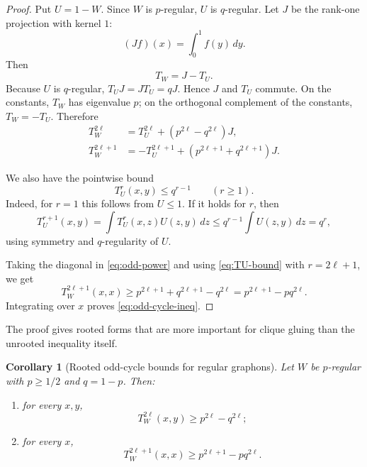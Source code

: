 \documentclass[11pt]{article}
\newtheorem{corollary}[theorem]{Corollary}
\theoremstyle{definition}
\begin{document}
\begin{proof}
Put $U=1-W$.  Since $W$ is $p$-regular, $U$ is $q$-regular.  Let $J$ be the rank-one projection with kernel $1$:
\[
  (Jf)(x)=\int_0^1 f(y)\,dy.
\]
Then
\[
  T_W=J-T_U.
\]
Because $U$ is $q$-regular, $T_UJ=JT_U=qJ$.  Hence $J$ and $T_U$ commute.  On the constants, $T_W$ has eigenvalue $p$; on the orthogonal complement of the constants, $T_W=-T_U$.  Therefore
\begin{align}
  T_W^{2\ell} &= T_U^{2\ell}+(p^{2\ell}-q^{2\ell})J, \label{eq:even-power}\\
  T_W^{2\ell+1} &= -T_U^{2\ell+1}+(p^{2\ell+1}+q^{2\ell+1})J. \label{eq:odd-power}
\end{align}

We also have the pointwise bound
\begin{equation}\label{eq:TU-bound}
  T_U^r(x,y)\le q^{r-1}\qquad(r\ge1).
\end{equation}
Indeed, for $r=1$ this follows from $U\le1$.  If it holds for $r$, then
\[
  T_U^{r+1}(x,y)=\int T_U^r(x,z)U(z,y)\,dz
  \le q^{r-1}\int U(z,y)\,dz=q^r,
\]
using symmetry and $q$-regularity of $U$.

Taking the diagonal in \eqref{eq:odd-power} and using \eqref{eq:TU-bound} with $r=2\ell+1$, we get
\[
  T_W^{2\ell+1}(x,x)
  \ge p^{2\ell+1}+q^{2\ell+1}-q^{2\ell}
  =p^{2\ell+1}-p q^{2\ell}.
\]
Integrating over $x$ proves \eqref{eq:odd-cycle-ineq}.
\end{proof}

The proof gives rooted forms that are more important for clique gluing than the unrooted inequality itself.

\begin{corollary}[Rooted odd-cycle bounds for regular graphons]\label{cor:rooted-regular-odd-cycles}
Let $W$ be $p$-regular with $p\ge1/2$ and $q=1-p$.  Then:
\begin{enumerate}[label=(\roman*)]
\item for every $x,y$,
\begin{equation}\label{eq:edge-rooted-regular}
  T_W^{2\ell}(x,y)\ge p^{2\ell}-q^{2\ell};
\end{equation}
\item for every $x$,
\begin{equation}\label{eq:vertex-rooted-regular}
  T_W^{2\ell+1}(x,x)\ge p^{2\ell+1}-p q^{2\ell}.
\end{equation}
\end{enumerate}
\end{corollary}
\end{document}
